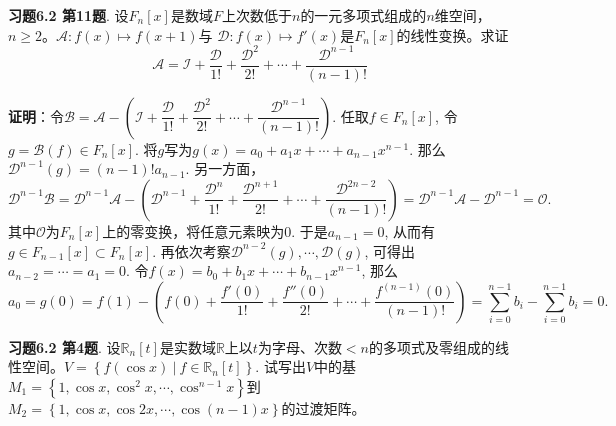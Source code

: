 \newpageorvspace


{\bf 习题6.2 第11题}. 设$F_n[x]$是数域$F$上次数低于$n$的一元多项式组成的$n$维空间，$n \geqslant 2$。$\mathscr{A}: f(x) \mapsto f(x+1)$与 $\mathscr{D}: f(x) \mapsto f'(x)$是$F_n[x]$的线性变换。求证
$$\mathscr{A} = \mathscr{I} + \dfrac{\mathscr{D}}{1!} + \dfrac{\mathscr{D}^2}{2!} + \cdots + \dfrac{\mathscr{D}^{n-1}}{(n-1)!}$$

{\bf 证明}：令$\mathscr{B} = \mathscr{A} - \left( \mathscr{I} + \dfrac{\mathscr{D}}{1!} + \dfrac{\mathscr{D}^2}{2!} + \cdots + \dfrac{\mathscr{D}^{n-1}}{(n-1)!} \right)$. 任取$f \in F_n[x]$, 令$g = \mathscr{B}(f) \in F_n[x]$. 将$g$写为$g(x) = a_0 + a_1x + \cdots + a_{n-1}x^{n-1}$. 那么$\mathscr{D}^{n-1}(g) = (n-1)! a_{n-1}$. 另一方面，
$$\mathscr{D}^{n-1} \mathscr{B} = \mathscr{D}^{n-1} \mathscr{A} - \left( \mathscr{D}^{n-1} + \dfrac{\mathscr{D}^n}{1!} + \dfrac{\mathscr{D}^{n+1}}{2!} + \cdots + \dfrac{\mathscr{D}^{2n-2}}{(n-1)!} \right) = \mathscr{D}^{n-1} \mathscr{A} - \mathscr{D}^{n-1} = \mathscr{O}.$$
其中$\mathscr{O}$为$F_n[x]$上的零变换，将任意元素映为$0$. 于是$a_{n-1} = 0$, 从而有$g\in F_{n-1}[x] \subset F_n[x]$. 再依次考察$\mathscr{D}^{n-2}(g), \cdots, \mathscr{D}(g)$, 可得出$a_{n-2} = \cdots = a_1 = 0$. 令$f(x) = b_0 + b_1x + \cdots + b_{n-1}x^{n-1}$, 那么
$$a_0 = g(0) = f(1) - \left( f(0) + \dfrac{f'(0)}{1!} + \dfrac{f''(0)}{2!} + \cdots + \dfrac{f^{(n-1)}(0)}{(n-1)!} \right) = \sum_{i=0}^{n-1} b_i - \sum_{i=0}^{n-1} b_i = 0.$$


\newpageorvspace


{\bf 习题6.2 第4题}. 设$\mathbb{R}_n[t]$是实数域$\mathbb{R}$上以$t$为字母、次数$<n$的多项式及零组成的线性空间。$V=\left\{ f(\cos x) \ |\ f \in \mathbb{R}_n[t] \right\}$. 试写出$V$中的基$M_1 = \left\{ 1, \cos x, \cos^2 x, \cdots, \cos^{n-1} x \right\}$到$M_2 = \left\{ 1, \cos x, \cos 2x, \cdots, \cos (n-1)x \right\}$的过渡矩阵。

